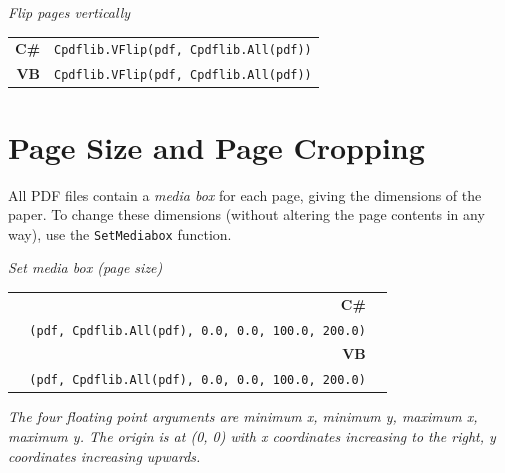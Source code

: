 \documentclass[a4paper]{memoir}
\begin{document}
\begin{framed}
\noindent\textit{Flip pages vertically}

\vspace{2mm}
\noindent\begin{tabular}{rl}
\small\sffamily\textbf{C\#} &
\begin{minipage}{4in}
\small\verb!Cpdflib.VFlip(pdf, Cpdflib.All(pdf))!
\end{minipage}\\[5mm]
\small\sffamily\textbf{VB} &
\begin{minipage}{4in}
\small\verb!Cpdflib.VFlip(pdf, Cpdflib.All(pdf))!
\end{minipage}\\[5mm]
\end{tabular}
\end{framed}

\section{Page Size and Page Cropping}
  All PDF files contain a \textit{media box} for each page, giving the
dimensions of the paper. To change these dimensions (without altering the page
contents in any way), use the \verb!SetMediabox! function.

\begin{framed}
\noindent\textit{Set media box (page size)}

\vspace{2mm}
\noindent\begin{tabular}{rl}
\small\sffamily\textbf{C\#} &
\begin{minipage}{4in}
\small\verb!Cpdflib.SetMediabox!\\
\verb!  (pdf, Cpdflib.All(pdf), 0.0, 0.0, 100.0, 200.0)!
\end{minipage}\\[5mm]
\small\sffamily\textbf{VB} &
\begin{minipage}{4in}
\small\verb!Cpdflib.SetMediabox!\\
\verb!  (pdf, Cpdflib.All(pdf), 0.0, 0.0, 100.0, 200.0)!
\end{minipage}\\[5mm]
\end{tabular}

\vspace{2mm}
\noindent\textit{The four floating point arguments are minimum x, minimum y, maximum x, maximum
  y. The origin is at (0, 0) with x coordinates increasing to the right, y coordinates increasing upwards.}

\end{framed}
\end{document}
